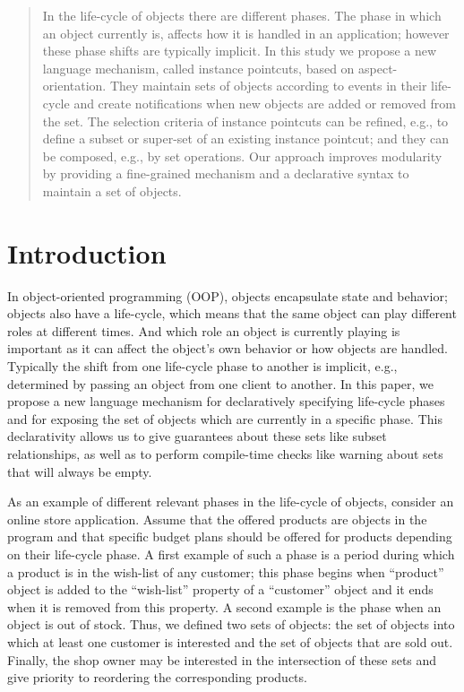 \begin{abstract}
In the life-cycle of objects there are different phases. The phase in which an object currently is, affects how it is handled in an application; however these phase shifts are typically implicit.
In this study we propose a new language mechanism, called instance pointcuts, based on aspect-orientation.
They maintain sets of objects according to events in their life-cycle and create notifications when new objects are added or removed from the set.
The selection criteria of instance pointcuts can be refined, e.g., to define a subset or super-set of an existing instance pointcut; and they can be composed, e.g., by set operations.
Our approach improves modularity by providing a fine-grained mechanism and a declarative syntax to maintain a set of objects.
\end{abstract}

\section{Introduction}
In object-oriented programming (OOP), objects encapsulate state and behavior; objects also have a life-cycle, which means that the same object can play different roles at different times. And which role an object is currently playing is important as it can affect the object's own behavior or how objects are handled. Typically the shift from one life-cycle phase to another is implicit, e.g., determined by passing an object from one client to another. In this paper, we propose a new language mechanism for declaratively specifying life-cycle phases and for exposing the set of objects which are currently in a specific phase. This declarativity allows us to give guarantees about these sets like subset relationships, as well as to perform compile-time checks like warning about sets that will always be empty.

As an example of different relevant phases in the life-cycle of objects, consider an online store application. Assume that the offered products are objects in the program and that specific budget plans should be offered for products depending on their life-cycle phase. A first example of such a phase is a period during which a product is in the wish-list of any customer; this phase begins when ``product'' object is added to the ``wish-list'' property of a ``customer'' object and it ends when it is removed from this property. A second example is the phase when an object is out of stock. Thus, we defined two sets of objects: the set of objects into which at least one customer is interested and the set of objects that are sold out. Finally, the shop owner may be interested in the intersection of these sets and give priority to reordering the corresponding products.


